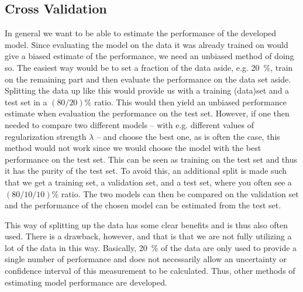 \subsection{Cross Validation}
\label{subsec:cross_validation}
In general we want to  be able to estimate the performance of the developed model. Since evaluating the model on the data it was already trained on would give a biased estimate of the performance, we need an unbiased method of doing so. The easiest way would be to set a fraction of the data aside, e.g. \SI{20}{\percent}, train on the remaining part and then evaluate the performance on the data set aside. Splitting the data up like this would provide us with a training (data)set and a test set in a $(80/20)\%$ ratio. This would then yield an unbiased performance estimate when evaluation the performance on the test set. 
However, if one then needed to compare two different models -- with e.g. different values of regularization strength $\lambda$ -- and choose the best one, as is often the case, this method would not work since we would choose the model with the best performance on the test set. This can be seen as training on the test set and thus it has  the purity of the test set. To avoid this, an additional split is made such that we get a training set, a validation set, and a test set, where you often see a $(80/10/10)\%$ ratio. The two models can then be compared on the validation set and the performance of the chosen model can be estimated from the test set. 



This way of splitting up the data has some clear benefits and is thus also often used. There is a drawback, however, and that is that we are not fully utilizing a lot of the data in this way. Basically, \SI{20}{\percent} of the data are only used to provide a single number of performance and does not necessarily allow an uncertainty or confidence interval of this measurement to be calculated. Thus, other methods of estimating model performance are developed. 

